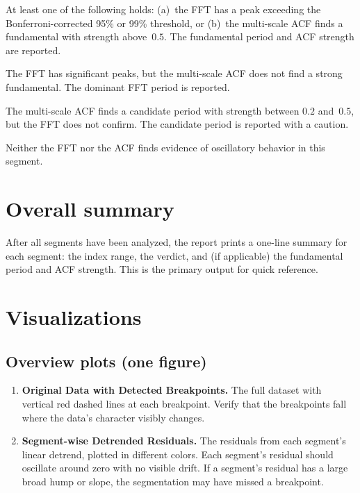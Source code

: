 \documentclass[11pt]{article}
\begin{document}
\begin{description}[style=nextline, leftmargin=3cm]
\item[PERIODIC] At least one of the following holds: (a)~the FFT has a
  peak exceeding the Bonferroni-corrected 95\% or 99\% threshold, or
  (b)~the multi-scale ACF finds a fundamental with strength above~$0.5$.
  The fundamental period and ACF strength are reported.

\item[PERIODIC (FFT only)] The FFT has significant peaks, but the
  multi-scale ACF does not find a strong fundamental.  The dominant FFT
  period is reported.

\item[POSSIBLY PERIODIC] The multi-scale ACF finds a candidate period
  with strength between $0.2$ and~$0.5$, but the FFT does not confirm.
  The candidate period is reported with a caution.

\item[NOT PERIODIC] Neither the FFT nor the ACF finds evidence of
  oscillatory behavior in this segment.
\end{description}

\section{Overall summary}

After all segments have been analyzed, the report prints a one-line
summary for each segment: the index range, the verdict, and (if
applicable) the fundamental period and ACF strength.  This is the primary
output for quick reference.

\section{Visualizations}

\subsection{Overview plots (one figure)}

\begin{enumerate}
\item \textbf{Original Data with Detected Breakpoints.}  The full dataset
  with vertical red dashed lines at each breakpoint.  Verify that the
  breakpoints fall where the data's character visibly changes.

\item \textbf{Segment-wise Detrended Residuals.}  The residuals from each
  segment's linear detrend, plotted in different colors.  Each segment's
  residual should oscillate around zero with no visible drift.  If a
  segment's residual has a large broad hump or slope, the segmentation may
  have missed a breakpoint.
\end{enumerate}
\end{document}
